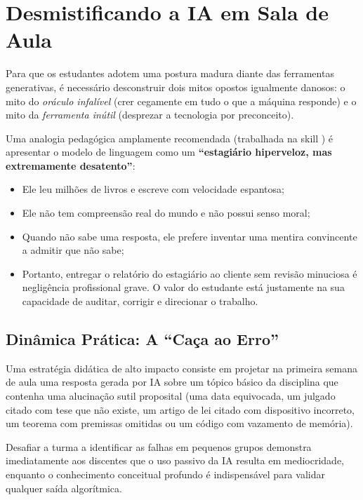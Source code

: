 \section{Desmistificando a IA em Sala de Aula}

Para que os estudantes adotem uma postura madura diante das ferramentas generativas, {\'e} necess{\'a}rio desconstruir dois mitos opostos igualmente danosos: o mito do \emph{or{\'a}culo infal{\'i}vel} (crer cegamente em tudo o que a m{\'a}quina responde) e o mito da \emph{ferramenta in{\'u}til} (desprezar a tecnologia por preconceito).

Uma analogia pedag{\'o}gica amplamente recomendada (trabalhada na skill ) {\'e} apresentar o modelo de linguagem como um \textbf{``estagi{\'a}rio hiperveloz, mas extremamente desatento''}:
\begin{itemize}
  \item Ele leu milh{\~o}es de livros e escreve com velocidade espantosa;
  \item Ele n{\~a}o tem compreens{\~a}o real do mundo e n{\~a}o possui senso moral;
  \item Quando n{\~a}o sabe uma resposta, ele prefere inventar uma mentira convincente a admitir que n{\~a}o sabe;
  \item Portanto, entregar o relat{\'o}rio do estagi{\'a}rio ao cliente sem revis{\~a}o minuciosa {\'e} neglig{\^e}ncia profissional grave. O valor do estudante est{\'a} justamente na sua capacidade de auditar, corrigir e direcionar o trabalho.
\end{itemize}

\subsection{Din{\^a}mica Pr{\'a}tica: A ``Ca{\c c}a ao Erro''}

Uma estrat{\'e}gia did{\'a}tica de alto impacto consiste em projetar na primeira semana de aula uma resposta gerada por IA sobre um t{\'o}pico b{\'a}sico da disciplina que contenha uma alucina{\c c}{\~a}o sutil proposital (uma data equivocada, um julgado citado com tese que n{\~a}o existe, um artigo de lei citado com dispositivo incorreto, um teorema com premissas omitidas ou um c{\'o}digo com vazamento de mem{\'o}ria). 

Desafiar a turma a identificar as falhas em pequenos grupos demonstra imediatamente aos discentes que o uso passivo da IA resulta em mediocridade, enquanto o conhecimento conceitual profundo {\'e} indispens{\'a}vel para validar qualquer sa{\'i}da algor{\'i}tmica.

